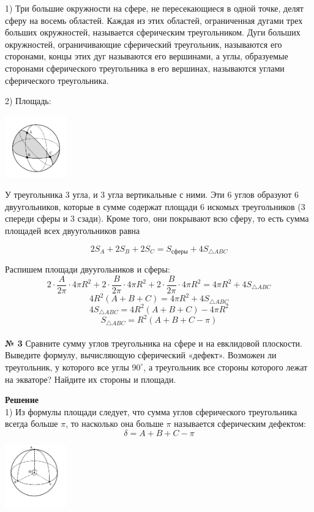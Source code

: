     1) Три большие окружности на сфере, не пересекающиеся в одной
    точке, делят сферу на восемь областей.
    Каждая из этих областей, ограниченная дугами трех больших
    окружностей, называется сферическим треугольником.
    Дуги больших окружностей, ограничивающие сферический треугольник, называются
    его сторонами, концы этих дуг называются его вершинами, а углы, образуемые сторонами сферического треугольника в его вершинах, называются углами сферического треугольника.

    2) Площадь:
    \begin{center}
        \includegraphics[width=0.2\textwidth]{images/Frame 24}\\
    \end{center}

    У треугольника 3 угла, и 3 угла вертикальные с ними.
    Эти 6 углов образуют 6 двуугольников, которые в сумме содержат площади 6 искомых треугольников
    (3 спереди сферы и 3 сзади).
    Кроме того, они покрывают всю сферу, то есть сумма площадей всех двуугольников равна

    \[
        2S_A + 2S_B + 2S_C = S_{\text{сферы}} + 4S_{\triangle ABC}
    \]

    Распишем площади двуугольников и сферы:
    \[
        2 \cdot \frac{A}{2\pi}\cdot 4\pi R^2 + 2 \cdot \frac{B}{2\pi}\cdot 4\pi R^2 + 2 \cdot \frac{B}{2\pi}\cdot 4\pi R^2 =
        4\pi R^2 + 4S_{\triangle ABC}
    \]
    \[
        4R^2(A + B + C) = 4\pi R^2 + 4S_{\triangle ABC}
    \]
    \[
        4S_{\triangle ABC} = 4R^2(A + B + C) - 4\pi R^2
    \]
    \[
        S_{\triangle ABC} = R^2(A + B + C - \pi)
    \]\\


    \textbf{№ 3}
    Сравните сумму углов треугольника на сфере и на евклидовой плоскости.
    Выведите формулу, вычисляющую сферический «дефект».
    Возможен ли треугольник, у которого все углы $90^\circ$,
    а треугольник все стороны которого лежат на экваторе?
    Найдите их стороны и площади.

    \textbf{Решение}\\

    1) Из формулы площади следует, что сумма углов сферического треугольника всегда больше $\pi$,
    то насколько она больше $\pi$ называется сферическим дефектом:
    \[
        \delta = A + B + C - \pi
    \]
    \begin{center}
        \includegraphics[width=0.2\textwidth]{images/img6}\\
    \end{center}


